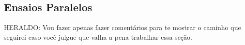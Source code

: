 \begin{center}
{\begin{longtable}[m]{| m{11em} | m{21em} |}

    \end{longtable}}
\end{center}



\FloatBarrier
\subsection{Ensaios Paralelos}

\color{red} HERALDO: Vou fazer apenas fazer comentários para te mostrar o caminho que seguirei caso você julgue que valha a pena trabalhar essa seção. 

